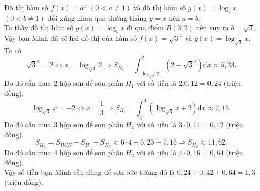 \begin{bt}
{\begin{center}
		\end{center}
		Đồ thị hàm số $f(x)=a^x$ $(0<a\ne1)$ và đồ  thị hàm số $g(x)=\log_b x$ $(0<b\ne1)$ đối xứng nhau qua đường thẳng $y=x$ nên $a=b$.\\
		Ta thấy đồ thị hàm số $g(x)=\log_b x$  đi qua điểm $B(3;2)$ nên suy ra $b=\sqrt{3}$.\\
		Vậy  bạn Minh đã vẽ hai đồ thị của hàm số $f(x)=\sqrt{3}^x$ và $g(x)=\log_{\sqrt{3}} x$.\\
		Ta  có
		$$ 
		\sqrt{3}^x=2 \Leftrightarrow x=\log_{\sqrt{3}}2 \Rightarrow S_{H_1} = \displaystyle\int_{-\log_{\sqrt{3}}2}^{2} \left(2 -  \sqrt{3}^x\right)\mathrm{d}x \approx 5{,}23 .$$
		Do đó cần mua 2 hộp sơn để sơn phần $H_1$ với số tiền là $2.0{,}12=0{,}24$  (triệu đồng).\\
		$$ 
		\log_{\sqrt{3}}x = -2 \Leftrightarrow x = \dfrac{1}{3} \Rightarrow S_{H_3} = \displaystyle\int_{\frac{1}{3}}^{3} \left(\log_{\sqrt{3}}x +  2\right)\mathrm{d}x \approx 7{,}15.$$
		Do đó cần mua 3 hộp sơn để sơn phần $H_3$ với số tiền là $3\cdot0{,}14=0{,}42$  (triệu đồng).\\
		$$ 
		S_{H_2} = S_{HCN} - S_{H_1} - S_{H_3} \approx 6\cdot 4 - 5{,}23 - 7{,}15 \Rightarrow  S_{H_2} \approx 11{,}62 .$$
		Do đó cần mua 4 hộp sơn để  sơn phần $H_2$ với số tiền là $4\cdot 0{,}16=0{,}64$ (triệu đồng).\\
		Vậy số tiền bạn Minh cần dùng để sơn bức tường đó là $0{,}24 + 0{,}42 + 0{,}64 = 1{,}3$  (triệu đồng).
	 }
\end{bt}

